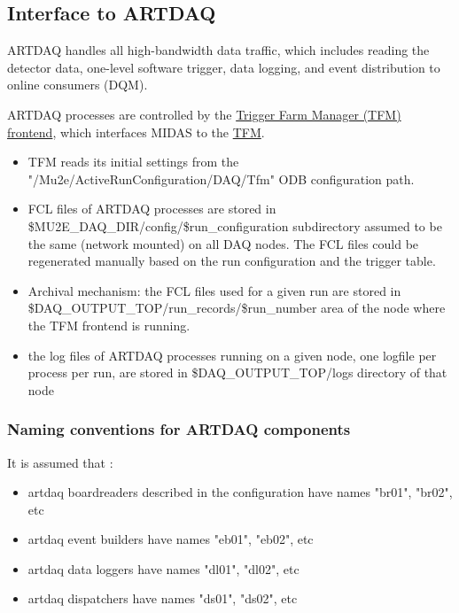 \subsection{Interface to ARTDAQ}
ARTDAQ handles all high-bandwidth data traffic, which includes reading the
detector data, one-level software trigger, data logging, and event distribution
to online consumers (DQM).

ARTDAQ processes are controlled by the  \href{https://github.com/pavel1murat/frontends/blob/main/tfm_frontend/tfm_launch_fe.py}
{\blue Trigger Farm Manager (TFM) frontend}, which interfaces MIDAS to the
\href{https://github.com/pavel1murat/tfm/blob/main/rc/control/farm_manager.py}{\blue TFM}.

\begin{itemize}
\item 
  TFM reads its initial settings from the "/Mu2e/ActiveRunConfiguration/DAQ/Tfm"
  ODB configuration path.
\item
  FCL files of ARTDAQ processes are stored in \$MU2E\_DAQ\_DIR/config/\$run\_configuration
  subdirectory assumed to be the same (network mounted) on all DAQ nodes.
  The FCL files could be regenerated manually based on the run configuration and the trigger table.
\item
  Archival mechanism: the FCL files used for a given run are stored in \\
  \$DAQ\_OUTPUT\_TOP/run\_records/\$run\_number area of the node where the TFM frontend is running.
\item
  the log files of ARTDAQ processes running on a given node, one logfile per process per run,
  are stored in \$DAQ\_OUTPUT\_TOP/logs directory of that node
\end{itemize}

\subsubsection{Naming conventions for ARTDAQ components}

It is assumed that :
\begin{itemize}
\item 
  artdaq boardreaders described in the configuration have names "br01", "br02", etc
\item 
  artdaq event builders have names "eb01", "eb02", etc
\item 
  artdaq data loggers have names "dl01", "dl02", etc
\item 
  artdaq dispatchers have names "ds01", "ds02", etc
\end{itemize}

